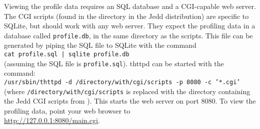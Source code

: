 \documentclass{article}
\begin{document}
Viewing the profile data requires an SQL database and a CGI-capable web
server. The CGI scripts (found in the  directory in the Jedd
distribution) are specific to SQLite, but should work with any
web server. They expect the profiling data in a database called
{\tt profile.db}, in the same directory as the scripts. This file can be
generated by piping the SQL file to SQLite with the command\\
{\tt cat profile.sql | sqlite profile.db}\\
(assuming the SQL file
is {\tt profile.sql}). thttpd can be started with the command:\\
{\tt /usr/sbin/thttpd -d /directory/with/cgi/scripts -p 8080 -c '*.cgi'}
(where {\tt /directory/with/cgi/scripts} is replaced with the directory
containing the Jedd CGI scripts from ). This starts
the web server on port 8080. To view the profiling data, point your
web browser to\\
\url{http://127.0.0.1:8080/main.cgi}.



\end{document}
